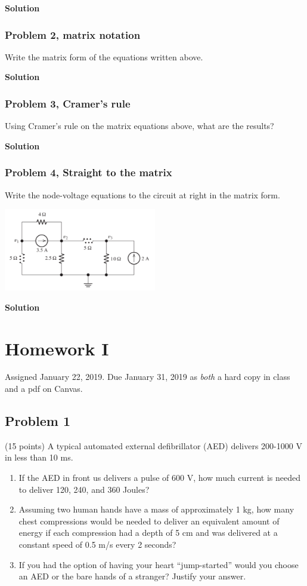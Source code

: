 \documentclass[11pt]{book}
\begin{document}
\textbf{Solution}


\subsection{Problem 2, matrix notation}
Write the matrix form of the equations written above. 


\textbf{Solution}


\subsection{Problem 3, Cramer's rule}
Using Cramer’s rule on the matrix equations above, what are the results?


\textbf{Solution}


\subsection{Problem 4, Straight to the matrix}
Write the node-voltage equations to the circuit at right in the matrix form.
\begin{center}
	\includegraphics[width=0.5\textwidth]{figures/04.problem4.png}
\end{center}


\textbf{Solution}





\chapter*{Homework I}
Assigned January 22, 2019. Due January 31, 2019 as \textit{both} a hard copy in class and a pdf on Canvas.
\setcounter{chapter}{1}
\setcounter{section}{0}
\section{Problem 1}
(15 points)	A typical automated external defibrillator (AED) delivers 200-1000 V in less than 10 ms. 
\begin{enumerate}
	\item If the AED in front us delivers a pulse of 600 V, how much current is needed to deliver 120, 240, and 360 Joules?
	\item Assuming two human hands have a mass of approximately 1 kg, how many chest compressions would be needed to deliver an equivalent amount of energy if each compression had a depth of 5 cm and was delivered at a constant speed of 0.5 m/s every 2 seconds?
	\item If you had the option of having your heart “jump-started” would you choose an AED or the bare hands of a stranger? Justify your answer.
\end{enumerate}
\end{document}
